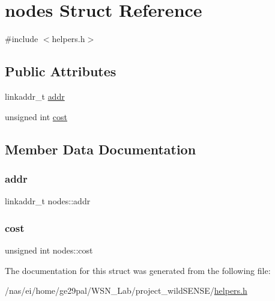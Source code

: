 \hypertarget{structnodes}{}\section{nodes Struct Reference}
\label{structnodes}


{\ttfamily \#include $<$helpers.\+h$>$}

\subsection*{Public Attributes}
\begin{DoxyCompactItemize}
\item 
linkaddr\+\_\+t \hyperlink{structnodes_a954ec89d56174fde639a77adc5fbabe2}{addr}
\item 
unsigned int \hyperlink{structnodes_a38381980f08673a003dee1e2b9d40e67}{cost}
\end{DoxyCompactItemize}


\subsection{Member Data Documentation}
\mbox{\label{structnodes_a954ec89d56174fde639a77adc5fbabe2}} 
\subsubsection{\texorpdfstring{addr}{addr}}
{\footnotesize\ttfamily linkaddr\+\_\+t nodes\+::addr}

\mbox{\label{structnodes_a38381980f08673a003dee1e2b9d40e67}} 
\subsubsection{\texorpdfstring{cost}{cost}}
{\footnotesize\ttfamily unsigned int nodes\+::cost}



The documentation for this struct was generated from the following file\+:\begin{DoxyCompactItemize}
\item 
/nas/ei/home/ge29pal/\+W\+S\+N\+\_\+\+Lab/project\+\_\+wild\+S\+E\+N\+S\+E/\hyperlink{helpers_8h}{helpers.\+h}\end{DoxyCompactItemize}
